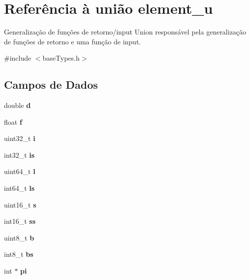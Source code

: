 \hypertarget{unionelement__u}{}\section{Referência à união element\+\_\+u}
\label{unionelement__u}


Generalização de funções de retorno/input Union responsável pela generalização de funções de retorno e uma função de input.  




{\ttfamily \#include $<$base\+Types.\+h$>$}

\subsection*{Campos de Dados}
\begin{DoxyCompactItemize}
\item 
\mbox{\label{unionelement__u_a055cfbd7f84724337a2cb16acdedab90}} 
double {\bfseries d}
\item 
\mbox{\label{unionelement__u_ad3caae754d93e7fa606a0756f5ddc6a6}} 
float {\bfseries f}
\item 
\mbox{\label{unionelement__u_ac1564bf5b02b69382469449ba266dc9a}} 
uint32\+\_\+t {\bfseries i}
\item 
\mbox{\label{unionelement__u_a8230539b3b28f57ac3fd61e10c76a740}} 
int32\+\_\+t {\bfseries is}
\item 
\mbox{\label{unionelement__u_aca3c96df160bc775791470b98e15710f}} 
uint64\+\_\+t {\bfseries l}
\item 
\mbox{\label{unionelement__u_af52b13fa38bfc4e5a98d4b868324ee27}} 
int64\+\_\+t {\bfseries ls}
\item 
\mbox{\label{unionelement__u_a85c036f57770aeab7ed90947ffdfda53}} 
uint16\+\_\+t {\bfseries s}
\item 
\mbox{\label{unionelement__u_ab90ee55202fd11a2dc3cf48c74e55dab}} 
int16\+\_\+t {\bfseries ss}
\item 
\mbox{\label{unionelement__u_a53d82c8469f011fdb1e35f88738aaf5e}} 
uint8\+\_\+t {\bfseries b}
\item 
\mbox{\label{unionelement__u_ae2cf2a77222a37a817fba0e70266ddf6}} 
int8\+\_\+t {\bfseries bs}
\item 
\mbox{\label{unionelement__u_a3c7acdaf4dc01ef8694967376100fc8f}} 
int $\ast$ {\bfseries pi}
\end{DoxyCompactItemize}


